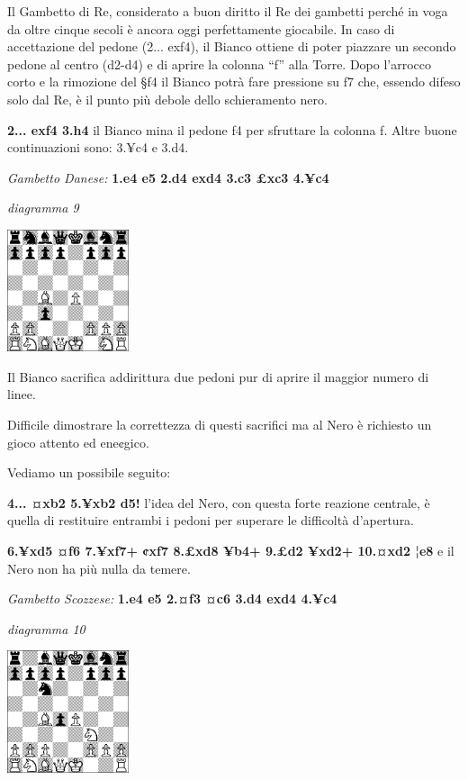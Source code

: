 \documentclass[
]{article}
\begin{document}
Il Gambetto di Re, considerato a buon diritto il Re dei gambetti perché
in voga da oltre cinque secoli è ancora oggi perfettamente giocabile. In
caso di accettazione del pedone (2... exf4), il Bianco ottiene di poter
piazzare un secondo pedone al centro (d2-d4) e di aprire la colonna
``f'' alla Torre. Dopo l'arrocco corto e la rimozione del §f4 il Bianco
potrà fare pressione su f7 che, essendo difeso solo dal Re, è il punto
più debole dello schieramento nero.

\textbf{2... exf4 3.h4} il Bianco mina il pedone f4 per sfruttare la
colonna f. Altre buone continuazioni sono: 3.¥c4 e 3.d4.

\emph{Gambetto Danese:} \textbf{1.e4 e5 2.d4 exd4 3.c3 £xc3 4.¥c4}

\emph{diagramma 9}

\includegraphics[width=1.40972in,height=1.40972in]{vertopal_109f12be458a423d8f3cc838880eaea2/media/image9.png}

Il Bianco sacrifica addirittura due pedoni pur di aprire il maggior
numero di linee.

Difficile dimostrare la correttezza di questi sacrifici ma al Nero è
richiesto un gioco attento ed ene¢gico.

Vediamo un possibile seguito:

\textbf{4... ¤xb2 5.¥xb2 d5!} l'idea del Nero, con questa forte reazione
centrale, è quella di restituire entrambi i pedoni per superare le
difficoltà d'apertura.

\textbf{6.¥xd5 ¤f6 7.¥xf7+ ¢xf7 8.£xd8 ¥b4+ 9.£d2 ¥xd2+ 10.¤xd2 ¦e8} e
il Nero non ha più nulla da temere.

\emph{Gambetto Scozzese:} \textbf{1.e4 e5 2.¤f3 ¤c6 3.d4 exd4 4.¥c4}

\emph{diagramma 10}

\includegraphics[width=1.40972in,height=1.40972in]{vertopal_109f12be458a423d8f3cc838880eaea2/media/image10.png}
\end{document}

